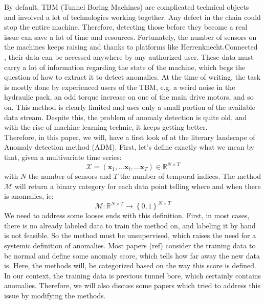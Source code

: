 \documentclass[../../main/main.tex]{subfiles}
\begin{document}

    By default, TBM (Tunnel Boring Machines) are complicated technical objects and involved  a lot of technologies working together. Any defect in the chain
    could stop the entire machine. Therefore, detecting those before they become a real issue can save a lot of time and resources. Fortunately, the number
    of sensors on the machines keeps raising  and thanks to platforms like Herrenknecht.Connected \cite{HKC.2024}, their data can be accessed anywhere by any authorized user. These data
    must carry a lot of information regarding the state of the machine, which begs the question of how to extract it to detect anomalies. At the time of writing,
    the task is mostly done by experienced users of the TBM, e.g. a weird noise in the hydraulic pack, an odd torque increase on one of the main drive motors,
    and so on. This method is clearly limited and uses only a small portion of the available data stream. Despite this, the problem of anomaly detection is quite
    old, and with the rise of machine learning technic, it keeps getting better. \\
    Therefore, in this paper, we will, have a first look of at the literary landscape of Anomaly detection method (ADM). First, let's define exactly what we mean by that, given a multivariate time series: 
    \[\mathcal{X} = (\textbf{x}_1, \dots \textbf{x}_t, \dots \textbf{x}_T) \in \mathbb{R}^{N \times T}\]
    with $N$ the number of sensors and $T$ the number of temporal indices. The method $\mathcal{M} $ will return a binary category for each data point 
    telling where and when there is anomalies, ie:
    \[\mathcal{M} : \mathbb{R}^{N \times T} \to \left\{0, 1\right\} ^{N \times T}\]
    We need to address some looses ends with this definition. First, in most cases, there is no already labeled data to train the method on, and labeling it
    by hand is not feasible. So the method must be unsupervised, which raises the need for a systemic definition of anomalies. Most papers (ref) consider the
    training data to be normal and define some anomaly score, which tells how far away the new data is. Here, the methods will, be categorized based on the way
    this score is defined.\\
    In our context, the training data is previous tunnel bore, which certainly contains anomalies. Therefore, we will also discuss some papers which tried to
    address this issue by modifying the methods. 
\end{document}
